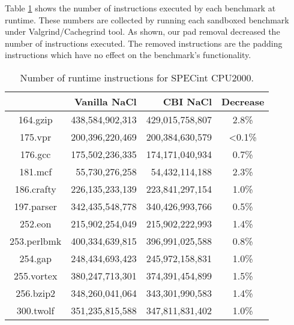 \documentclass[conference]{IEEEtran}
\begin{document}
Table \ref{tab:insn} shows the number of instructions executed by each benchmark at  runtime. These numbers are collected by running each sandboxed benchmark under Valgrind/Cachegrind tool. As  shown, our pad removal decreased the number of instructions executed. The removed instructions are the padding instructions which have no effect on the  benchmark's functionality.



\begin{table}
\centering
\caption{Number of runtime instructions for SPECint CPU2000.}
\label{tab:insn}
\begin{tabular}{|c||r|r|c|} \hline
&\textbf{Vanilla NaCl}&\textbf{CBI NaCl}& \!\small{Decrease}\!\! \\ \hline  \hline    
164.gzip&438,584,902,313&429,015,758,807&2.8\%\\ \hline  
175.vpr&200,396,220,469&200,384,630,579&\textless0.1\%\\ \hline	%
176.gcc&175,502,236,335&174,171,040,934&0.7\%\\ \hline 
181.mcf&55,730,276,258&54,432,114,188&2.3\%\\ \hline
186.crafty&226,135,233,139&223,841,297,154&1.0\%\\ \hline  
197.parser&342,435,548,778&340,426,993,766&0.5\%\\ \hline 
252.eon&215,902,254,049&215,902,222,993&1.4\%\\ \hline	%
253.perlbmk&400,334,639,815&396,991,025,588&0.8\%\\ \hline 
254.gap&248,434,693,423&245,972,158,831&1.0\%\\ \hline 
255.vortex&380,247,713,301&374,391,454,899&1.5\%\\ \hline 
256.bzip2&348,260,041,064&343,301,990,583&1.4\%\\ \hline  
300.twolf&351,235,815,588&347,811,831,402&1.0\%\\ \hline
\end{tabular}
\end{table}
\end{document}
